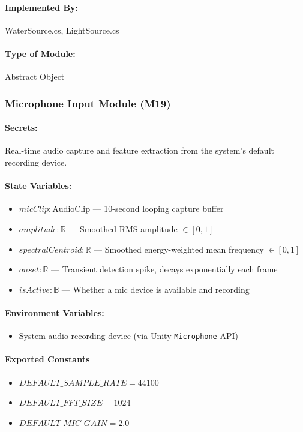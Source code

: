 \documentclass[12pt, titlepage]{article}
\begin{document}
\paragraph{Implemented By:}
WaterSource.cs, LightSource.cs

\paragraph{Type of Module:}
Abstract Object

\vspace{10mm}

\subsubsection{Microphone Input Module (M19)} \label{M19}

\paragraph{Secrets:}
Real-time audio capture and feature extraction from the system's default recording device.

\paragraph{State Variables:}
\begin{itemize}
\item $micClip : \text{AudioClip}$ --- 10-second looping capture buffer
\item $amplitude : \mathbb{R}$ --- Smoothed RMS amplitude $\in [0, 1]$
\item $spectralCentroid : \mathbb{R}$ --- Smoothed energy-weighted mean frequency $\in [0, 1]$
\item $onset : \mathbb{R}$ --- Transient detection spike, decays exponentially each frame
\item $isActive : \mathbb{B}$ --- Whether a mic device is available and recording
\end{itemize}

\paragraph{Environment Variables:}
\begin{itemize}
\item System audio recording device (via Unity \texttt{Microphone} API)
\end{itemize}

\paragraph{Exported Constants}
\begin{itemize}
\item $DEFAULT\_SAMPLE\_RATE = 44100$
\item $DEFAULT\_FFT\_SIZE = 1024$
\item $DEFAULT\_MIC\_GAIN = 2.0$
\end{itemize}
\end{document}
